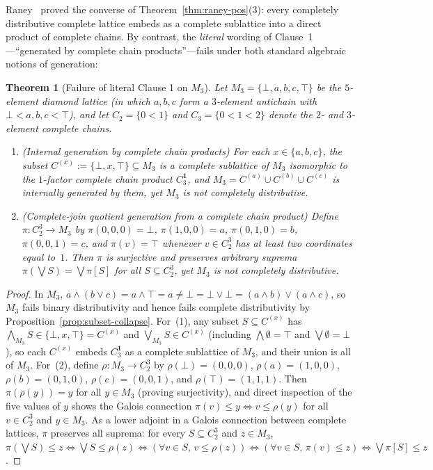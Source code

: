 \documentclass[11pt,a4paper]{article}
\theoremstyle{plain}
\newtheorem{theorem}{Theorem}[section]
\theoremstyle{definition}
\begin{document}
Raney~\cite{Raney1953} proved the converse of Theorem~\ref{thm:raney-pos}(3): every
completely distributive complete lattice embeds as a complete sublattice into a direct
product of complete chains. By contrast, the \emph{literal} wording of Clause~1---``generated
by complete chain products''---fails under both standard algebraic notions of generation:

\begin{theorem}[Failure of literal Clause 1 on $M_3$]
\label{thm:clause1-literal}
Let $M_3 = \{\bot, a, b, c, \top\}$ be the $5$-element diamond lattice (in which $a, b, c$
form a $3$-element antichain with $\bot < a, b, c < \top$), and let $C_2 = \{0 < 1\}$ and
$C_3 = \{0 < 1 < 2\}$ denote the $2$- and $3$-element complete chains.
\begin{enumerate}
  \item \emph{(Internal generation by complete chain products)} For each $x \in \{a, b, c\}$,
    the subset $C^{(x)} := \{\bot, x, \top\} \subseteq M_3$ is a complete sublattice of
    $M_3$ isomorphic to the $1$-factor complete chain product $C_3^{\mathbf{1}}$, and
    $M_3 = C^{(a)} \cup C^{(b)} \cup C^{(c)}$ is internally generated by them, yet $M_3$
    is not completely distributive.
  \item \emph{(Complete-join quotient generation from a complete chain product)} Define
    $\pi : C_2^3 \to M_3$ by $\pi(0,0,0) = \bot$, $\pi(1,0,0) = a$, $\pi(0,1,0) = b$,
    $\pi(0,0,1) = c$, and $\pi(v) = \top$ whenever $v \in C_2^3$ has at least two coordinates
    equal to~$1$. Then $\pi$ is surjective and preserves arbitrary suprema
    $\pi(\bigvee S) = \bigvee \pi[S]$ for all $S \subseteq C_2^3$, yet $M_3$ is not
    completely distributive.
\end{enumerate}
\end{theorem}

\begin{proof}
In $M_3$, $a \wedge (b \vee c) = a \wedge \top = a \neq \bot = \bot \vee \bot = (a \wedge b) \vee (a \wedge c)$,
so $M_3$ fails binary distributivity and hence fails complete distributivity by
Proposition~\ref{prop:subset-collapse}. For~(1), any subset $S \subseteq C^{(x)}$ has
$\bigwedge_{M_3} S \in \{\bot, x, \top\} = C^{(x)}$ and $\bigvee_{M_3} S \in C^{(x)}$
(including $\bigwedge \emptyset = \top$ and $\bigvee \emptyset = \bot$), so each $C^{(x)}$
embeds $C_3^{\mathbf{1}}$ as a complete sublattice of $M_3$, and their union is all of $M_3$.
For~(2), define $\rho : M_3 \to C_2^3$ by $\rho(\bot) = (0,0,0)$, $\rho(a) = (1,0,0)$,
$\rho(b) = (0,1,0)$, $\rho(c) = (0,0,1)$, and $\rho(\top) = (1,1,1)$. Then $\pi(\rho(y)) = y$
for all $y \in M_3$ (proving surjectivity), and direct inspection of the five values of $y$
shows the Galois connection $\pi(v) \le y \iff v \le \rho(y)$ for all $v \in C_2^3$ and
$y \in M_3$. As a lower adjoint in a Galois connection between complete lattices, $\pi$
preserves all suprema: for every $S \subseteq C_2^3$ and $z \in M_3$,
$\pi(\bigvee S) \le z \iff \bigvee S \le \rho(z) \iff (\forall v \in S,\, v \le \rho(z))
\iff (\forall v \in S,\, \pi(v) \le z) \iff \bigvee \pi[S] \le z$.
\end{proof}
\end{document}
